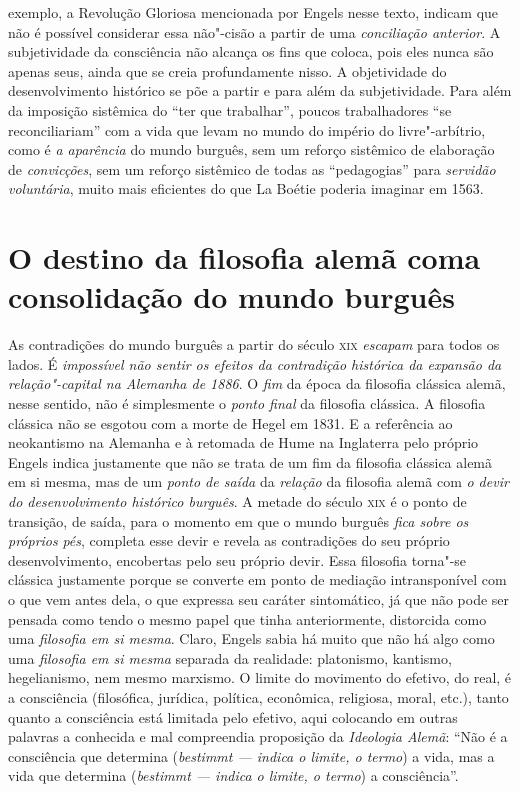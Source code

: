 exemplo, a Revolução Gloriosa mencionada por Engels nesse texto, indicam
que não é possível considerar essa não"-cisão a partir de uma
\emph{conciliação anterior}. A subjetividade da consciência não alcança
os fins que coloca, pois eles nunca são apenas seus, ainda que se creia
profundamente nisso. A objetividade do desenvolvimento histórico se põe
a partir e para além da subjetividade. Para além da imposição sistêmica
do ``ter que trabalhar'', poucos trabalhadores ``se reconciliariam'' com
a vida que levam no mundo do império do livre"-arbítrio, como é \emph{a
aparência} do mundo burguês, sem um reforço sistêmico de elaboração de
\emph{convicções}, sem um reforço sistêmico de todas as ``pedagogias''
para \emph{servidão voluntária}, muito mais eficientes do que La Boétie
poderia imaginar em 1563.

\section*{O destino da filosofia alemã com\break a consolidação do mundo burguês}

As contradições do mundo burguês a partir do século \textsc{xix}
\emph{escapam} para todos os lados. É \emph{impossível não sentir os
efeitos da contradição histórica da expansão da relação"-capital na
Alemanha de 1886}. O \emph{fim} da época da filosofia clássica alemã,
nesse sentido, não é simplesmente o \emph{ponto final} da filosofia
clássica. A filosofia clássica não se esgotou com a morte de Hegel em
1831. E a referência ao neokantismo na Alemanha e à retomada de Hume na
Inglaterra pelo próprio Engels indica justamente que não se trata de um
fim da filosofia clássica alemã em si mesma, mas de um \emph{ponto de
saída} da \emph{relação} da filosofia alemã com \emph{o devir do
desenvolvimento histórico burguês}. A metade do século \textsc{xix} é o
ponto de transição, de saída, para o momento em que o mundo burguês
\emph{fica sobre os próprios} \emph{pés}, completa esse devir e revela
as contradições do seu próprio desenvolvimento, encobertas pelo seu
próprio devir. Essa filosofia torna"-se clássica justamente porque se
converte em ponto de mediação intransponível com o que vem antes dela, o
que expressa seu caráter sintomático, já que não pode ser pensada como
tendo o mesmo papel que tinha anteriormente, distorcida como uma
\emph{filosofia em si mesma}. Claro, Engels sabia há muito que não há
algo como uma \emph{filosofia em si mesma} separada da realidade:
platonismo, kantismo, hegelianismo, nem mesmo marxismo. O limite do
movimento do efetivo, do real, é a consciência (filosófica, jurídica,
política, econômica, religiosa, moral, etc.), tanto quanto a consciência
está limitada pelo efetivo, aqui colocando em outras palavras a
conhecida e mal compreendia proposição da \emph{Ideologia Alemã}: ``Não
é a consciência que determina (\emph{bestimmt --- indica o limite, o
termo}) a vida, mas a vida que determina (\emph{bestimmt --- indica o
limite, o termo}) a consciência''.

